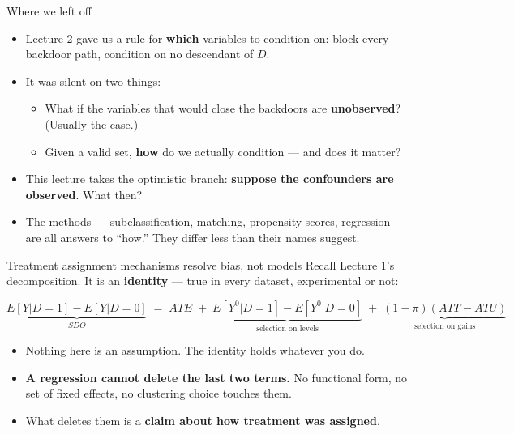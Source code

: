 \documentclass[
  11pt,
  ignorenonframetext,
  aspectratio=169,
]{beamer}
\providecommand{\tightlist}{%
  \setlength{\itemsep}{0pt}\setlength{\parskip}{0pt}}
\begin{document}
\begin{frame}{Where we left off}
\protect{}\label{where-we-left-off}
\begin{itemize}
\tightlist
\item
  Lecture 2 gave us a rule for \textbf{which} variables to condition on:
  block every backdoor path, condition on no descendant of \(D\).
\item
  It was silent on two things:

  \begin{itemize}
  \tightlist
  \item
    What if the variables that would close the backdoors are
    \textbf{unobserved}? (Usually the case.)
  \item
    Given a valid set, \textbf{how} do we actually condition --- and
    does it matter?
  \end{itemize}
\item
  This lecture takes the optimistic branch: \textbf{suppose the
  confounders are observed}. What then?
\item
  The methods --- subclassification, matching, propensity scores,
  regression --- are all answers to ``how.'' They differ less than their
  names suggest.
\end{itemize}
\end{frame}

\begin{frame}{Treatment assignment mechanisms resolve bias, not models}
\protect{}\label{treatment-assignment-mechanisms-resolve-bias-not-models}
Recall Lecture 1's decomposition. It is an \textbf{identity} --- true in
every dataset, experimental or not:

\[
\underbrace{E[Y|D{=}1] - E[Y|D{=}0]}_{SDO}
\;=\; ATE
\;+\; \underbrace{E[Y^0|D{=}1] - E[Y^0|D{=}0]}_{\text{selection on levels}}
\;+\; \underbrace{(1-\pi)(ATT - ATU)}_{\text{selection on gains}}
\]

\begin{itemize}
\tightlist
\item
  Nothing here is an assumption. The identity holds whatever you do.
\item
  \textbf{A regression cannot delete the last two terms.} No functional
  form, no set of fixed effects, no clustering choice touches them.
\item
  What deletes them is a \textbf{claim about how treatment was
  assigned}.
\end{itemize}
\end{frame}
\end{document}
